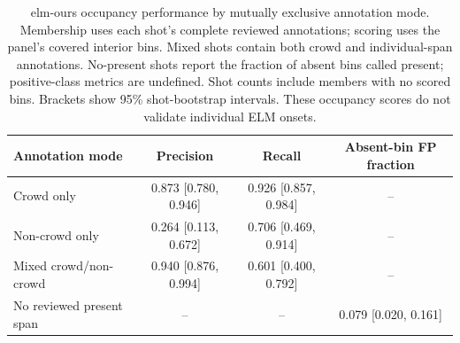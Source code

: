 \begin{table}[t]
\begin{tabular}{lccc}
\toprule
Annotation mode & Precision & Recall & Absent-bin FP fraction \\
\midrule
Crowd only & 0.873 {\scriptsize[0.780, 0.946]} & 0.926 {\scriptsize[0.857, 0.984]} & -- \\
Non-crowd only & 0.264 {\scriptsize[0.113, 0.672]} & 0.706 {\scriptsize[0.469, 0.914]} & -- \\
Mixed crowd/non-crowd & 0.940 {\scriptsize[0.876, 0.994]} & 0.601 {\scriptsize[0.400, 0.792]} & -- \\
No reviewed present span & -- & -- & 0.079 {\scriptsize[0.020, 0.161]} \\
\bottomrule
\end{tabular}\par\medskip\caption{elm-ours occupancy performance by mutually exclusive annotation mode. Membership uses each shot's complete reviewed annotations; scoring uses the panel's covered interior bins. Mixed shots contain both crowd and individual-span annotations. No-present shots report the fraction of absent bins called present; positive-class metrics are undefined. Shot counts include members with no scored bins. Brackets show 95\% shot-bootstrap intervals. These occupancy scores do not validate individual ELM onsets.}
\label{tab:elm-annotation-modes}
\end{table}
